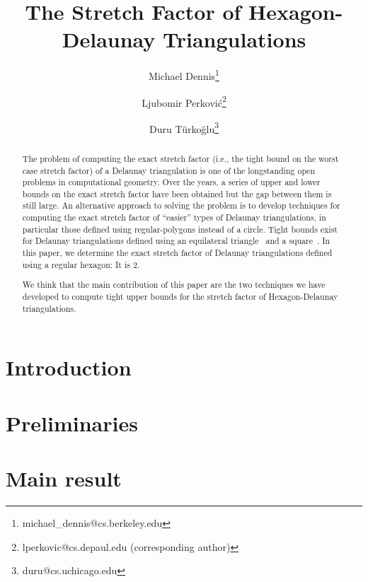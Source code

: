 \documentclass[11pt,USenglish]{article}
\title{The Stretch Factor of Hexagon-Delaunay Triangulations}
\author[1]{Michael Dennis\thanks{michael\_dennis@cs.berkeley.edu}}
\author[2]{Ljubomir Perkovi\'{c}\thanks{lperkovic@cs.depaul.edu (corresponding author)}}
\author[2]{Duru T\"{u}rko\u{g}lu\thanks{duru@cs.uchicago.edu}}
\affil[1]{Computer Science Division, University of California at Berkeley, Berkeley, CA, USA}
\affil[2]{School of Computing, DePaul University, Chicago, IL, USA}
\date{}
\theoremstyle{plain}%
\theoremstyle{definition}
\begin{document}

\maketitle

\begin{abstract}
The problem of computing the exact stretch factor (i.e., the tight bound on the
worst case stretch factor) of a Delaunay triangulation is one of the
longstanding open problems in computational geometry. Over the
years, a series of upper and lower bounds on the exact stretch factor have
been obtained but the gap between them is still large. An alternative approach
to solving the problem is to develop techniques for computing the exact stretch
factor of ``easier'' types of Delaunay triangulations, in particular those
defined using regular-polygons instead
of a circle. Tight bounds exist for Delaunay triangulations defined using
an equilateral triangle~\cite{Chew89} and a square~\cite{BGHP15}. In this paper,
we determine the exact stretch factor of Delaunay triangulations defined using
a regular hexagon: It is $2$.

We think that the main contribution of this paper are the two techniques we
have developed to compute tight upper bounds for the stretch factor of
Hexagon-Delaunay triangulations.%
\end{abstract}






\section{Introduction}
\label{sec:intro}


\section{Preliminaries}
\label{sec:prelim}


\section{Main result}
\label{sec:main}

\end{document}
